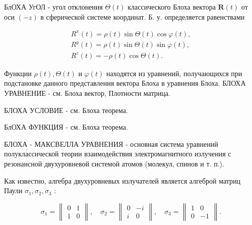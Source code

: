 \documentclass[10pt]{article}
\begin{document}
БлОХА УгОЛ - угол отклонения $\Theta(t)$ классического Блоха вектора $\boldsymbol{R}(t)$ от оси $(-z)$ в сферической системе координат. Б. у. определяется равенствами



\[

\begin{gathered}

R^{x}(t)=\rho(t) \sin \Theta(t) \cos \varphi(t), \\

R^{y}(t)=\rho(t) \sin \Theta(t) \sin \varphi(t), \\

R^{z}(t)=-\rho(t) \cos \Theta(t) .

\end{gathered}

\]



Функции $\rho(t), \Theta(t)$ и $\varphi(t)$ находятся из уравнений, получающихся при подстановке данного представления вектора Блоха в уравнения Блоха. БЛОХА УРАВНЕНИЕ - см. Блоха вектор, Плотности матрица.



БЛОХА УСЛОВИЕ - см. Блоха теорема.



БлОХА ФУНКЦИЯ - см. Блоха теорема.



БЛОХА - МАКСВЕЛЛА УРАВНЕНИЯ - основная система уравнений полуклассической теории взаимодействия электромагнитного излучения с резонансной двухуровневой системой атомов (молекул, спинов и т. п.).



Как известно, алгебра двухуровневых излучателей является алгеброй матриц Паули $\sigma_{1}, \sigma_{2}, \sigma_{3}$ :



\[

\sigma_{1}=\left\|\begin{array}{ll}

0 & 1 \\

1 & 0

\end{array}\right\|, \quad \sigma_{2}=\left\|\begin{array}{cc}

0 & -i \\

i & 0

\end{array}\right\|, \quad \sigma_{3}=\left\|\begin{array}{cc}

1 & 0 \\

0 & -1

\end{array}\right\| .

\]
\end{document}
